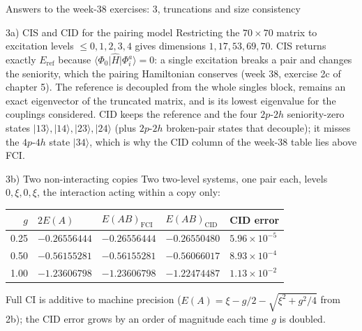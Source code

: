 \documentclass[aspectratio=169,10pt]{beamer}
\newcommand{\ket}[1]{\vert #1\rangle}
\newcommand{\element}[3]{\langle #1\vert #2\vert #3\rangle}
\begin{document}
\begin{frame}[shrink=4]{Answers to the week-38 exercises: 3, truncations and size consistency}
  \footnotesize
  \begin{block}{3a) CIS and CID for the pairing model}
    Restricting the $70\times70$ matrix to excitation levels $\le0,1,2,3,4$ gives dimensions $1,17,53,69,70$. CIS returns exactly $E_{\mathrm{ref}}$ because $\element{\Phi_0}{\hat{H}}{\Phi_i^a}=0$: a single excitation breaks a pair and changes the seniority, which the pairing Hamiltonian conserves (week 38, exercise 2c of chapter 5). The reference is decoupled from the whole singles block, remains an exact eigenvector of the truncated matrix, and is its lowest eigenvalue for the couplings considered. CID keeps the reference and the four $2p$-$2h$ seniority-zero states $\ket{13},\ket{14},\ket{23},\ket{24}$ (plus $2p$-$2h$ broken-pair states that decouple); it misses the $4p$-$4h$ state $\ket{34}$, which is why the CID column of the week-38 table lies above FCI.
  \end{block}
  \begin{block}{3b) Two non-interacting copies}
    Two two-level systems, one pair each, levels $0,\xi,0,\xi$, the interaction acting within a copy only:
    \begin{center}\scriptsize
    \begin{tabular}{rllll}
    $g$ & $2E(A)$ & $E(AB)_{\mathrm{FCI}}$ & $E(AB)_{\mathrm{CID}}$ & CID error\\\hline
    0.25 & $-0.26556444$ & $-0.26556444$ & $-0.26550480$ & $5.96\times10^{-5}$\\
    0.50 & $-0.56155281$ & $-0.56155281$ & $-0.56066017$ & $8.93\times10^{-4}$\\
    1.00 & $-1.23606798$ & $-1.23606798$ & $-1.22474487$ & $1.13\times10^{-2}$
    \end{tabular}
    \end{center}
    Full CI is additive to machine precision ($E(A)=\xi-g/2-\sqrt{\xi^2+g^2/4}$ from 2b); the CID error grows by an order of magnitude each time $g$ is doubled.
  \end{block}
\end{frame}
\end{document}
